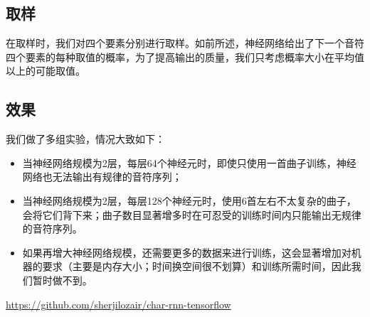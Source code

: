 \documentclass{article}
\begin{document}
  \subsection{取样}
    在取样时，我们对四个要素分别进行取样。如前所述，神经网络给出了下一个音符四个要素的每种取值的概率，为了提高输出的质量，我们只考虑概率大小在平均值以上的可能取值。
  \subsection{效果}
  \label{result_of_CompoNet}
    我们做了多组实验，情况大致如下：
    \begin{itemize}
    \item 当神经网络规模为2层，每层64个神经元时，即使只使用一首曲子训练，神经网络也无法输出有规律的音符序列；
    \item 当神经网络规模为2层，每层128个神经元时，使用6首左右不太复杂的曲子，会将它们背下来；曲子数目显著增多时在可忍受的训练时间内只能输出无规律的音符序列。
    \item 如果再增大神经网络规模，还需要更多的数据来进行训练，这会显著增加对机器的要求（主要是内存大小；时间换空间很不划算）和训练所需时间，因此我们暂时做不到。
    \end{itemize}
    
\begin{thebibliography}{}
 \url{https://github.com/sherjilozair/char-rnn-tensorflow}
\end{thebibliography}

\ifx \allfiles \undefined
\end{document}

